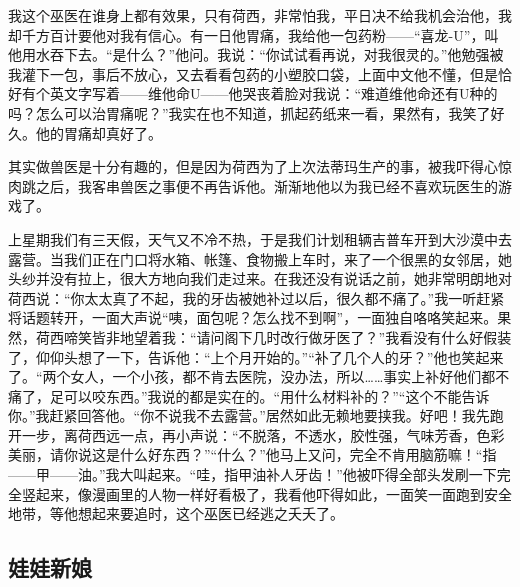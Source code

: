 \par 我这个巫医在谁身上都有效果，只有荷西，非常怕我，平日决不给我机会治他，我却千方百计要他对我有信心。有一日他胃痛，我给他一包药粉——“喜龙-U”，叫他用水吞下去。“是什么？”他问。我说：“你试试看再说，对我很灵的。”他勉强被我灌下一包，事后不放心，又去看看包药的小塑胶口袋，上面中文他不懂，但是恰好有个英文字写着——维他命U——他哭丧着脸对我说：“难道维他命还有U种的吗？怎么可以治胃痛呢？”我实在也不知道，抓起药纸来一看，果然有，我笑了好久。他的胃痛却真好了。
\par 其实做兽医是十分有趣的，但是因为荷西为了上次法蒂玛生产的事，被我吓得心惊肉跳之后，我客串兽医之事便不再告诉他。渐渐地他以为我已经不喜欢玩医生的游戏了。
\par 上星期我们有三天假，天气又不冷不热，于是我们计划租辆吉普车开到大沙漠中去露营。当我们正在门口将水箱、帐篷、食物搬上车时，来了一个很黑的女邻居，她头纱并没有拉上，很大方地向我们走过来。在我还没有说话之前，她非常明朗地对荷西说：“你太太真了不起，我的牙齿被她补过以后，很久都不痛了。”我一听赶紧将话题转开，一面大声说“咦，面包呢？怎么找不到啊”，一面独自咯咯笑起来。果然，荷西啼笑皆非地望着我：“请问阁下几时改行做牙医了？”我看没有什么好假装了，仰仰头想了一下，告诉他：“上个月开始的。”“补了几个人的牙？”他也笑起来了。“两个女人，一个小孩，都不肯去医院，没办法，所以……事实上补好他们都不痛了，足可以咬东西。”我说的都是实在的。“用什么材料补的？”“这个不能告诉你。”我赶紧回答他。“你不说我不去露营。”居然如此无赖地要挟我。好吧！我先跑开一步，离荷西远一点，再小声说：“不脱落，不透水，胶性强，气味芳香，色彩美丽，请你说这是什么好东西？”“什么？”他马上又问，完全不肯用脑筋嘛！“指——甲——油。”我大叫起来。“哇，指甲油补人牙齿！”他被吓得全部头发刷一下完全竖起来，像漫画里的人物一样好看极了，我看他吓得如此，一面笑一面跑到安全地带，等他想起来要追时，这个巫医已经逃之夭夭了。




\subsection{娃娃新娘}

